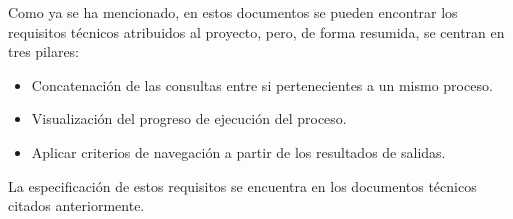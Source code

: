 \vspace{5mm}

Como ya se ha mencionado, en estos documentos se pueden encontrar los requisitos técnicos atribuidos al proyecto, pero, de forma resumida, se centran en tres pilares:

\begin{itemize}
	\item  Concatenación de las consultas entre si pertenecientes a un mismo proceso.
	\item  Visualización del progreso de ejecución del proceso.
	\item Aplicar criterios de navegación a partir de los resultados de salidas.
\end{itemize}

La especificación de estos requisitos se encuentra en los documentos técnicos citados anteriormente.


	 